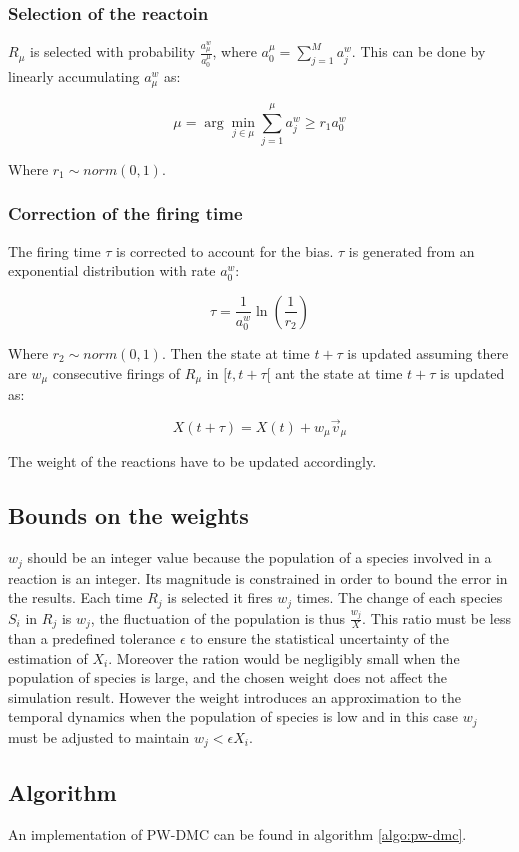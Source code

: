     \subsubsection{Selection of the reactoin}
    $R_\mu$ is selected with probability $\frac{a_\mu^w}{a_0^\mu}$, where $a_0^\mu = \sum\limits_{j=1}^Ma_j^w$.
    This can be done by linearly accumulating $a_\mu^w$ as:

    $$\mu = \arg\min\limits_{j\in \mu}\sum\limits_{j=1}^\mu a_j^w\ge r_1a_0^w$$

    Where $r_1\sim norm(0,1)$.

    \subsubsection{Correction of the firing time}
    The firing time $\tau$ is corrected to account for the bias.
    $\tau$ is generated from an exponential distribution with rate $a_0^w$:

    $$\tau = \frac{1}{a_0^w}\ln\left(\frac{1}{r_2}\right)$$

    Where $r_2\sim norm(0,1)$.
    Then the state at time $t+\tau$ is updated assuming there are $w_\mu$ consecutive firings of $R_\mu$ in $[t,t+\tau[$ ant the state at time $t+\tau$ is updated as:

    $$X(t+\tau) = X(t) + w_\mu\vec{v}_\mu$$

    The weight of the reactions have to be updated accordingly.

  \subsection{Bounds on the weights}
  $w_j$ should be an integer value because the population of a species involved in a reaction is an integer.
  Its magnitude is constrained in order to bound the error in the results.
  Each time $R_j$ is selected it fires $w_j$ times.
  The change of each species $S_i$ in $R_j$ is $w_j$, the fluctuation of the population is thus $\frac{w_j}{X}$.
  This ratio must be less than a predefined tolerance $\epsilon$ to ensure the statistical uncertainty of the estimation of $X_i$.
  Moreover the ration would be negligibly small when the population of species is large, and the chosen weight does not affect the simulation result.
  However the weight introduces an approximation to the temporal dynamics when the population of species is low and in this case $w_j$ must be adjusted to maintain $w_j< \epsilon X_i$.

  \subsection{Algorithm}
  An implementation of PW-DMC can be found in algorithm \ref{algo:pw-dmc}.

